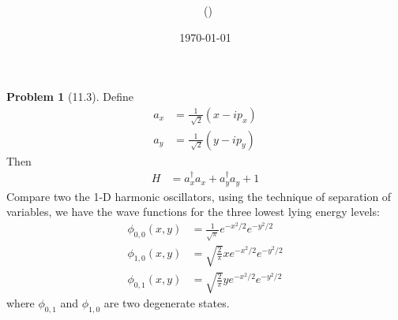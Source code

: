 \documentclass[twoside,11pt]{article}
\title{{\lms \Code \ \Ass}}
\author{\lms \name \ (\href{mailto:\mail}{\mail})}
\date{\sffamily \today}
\makeatletter
\theoremstyle{definition}
\newtheorem{problem}{Problem}
\theoremstyle{remark}
\newtheorem*{remark}{Remark}
\renewcommand{\maketitle}{\bgroup\setlength{\parindent}{0pt}
\begin{flushleft}
  \textbf{\Large\@title}

  \@author
\end{flushleft}\egroup
}
\makeatother
\begin{document}
\maketitle
\thispagestyle{title}



\begin{problem}[11.3]
Define
\begin{align*}
    a_x &= \frac{1}{\sqrt[]{2}}(x - ip_x)\\
    a_y &= \frac{1}{\sqrt[]{2}}(y - ip_y)
\end{align*}
Then 
\begin{align*}
    H &= a_x^\dagger a_x + a_y^\dagger a_y + 1
\end{align*}
Compare two the 1-D harmonic oscillators, using the technique of separation of variables,
we have the wave functions for the three lowest lying energy levels:
\begin{align*}
    \phi_{0,0}(x, y) &= \frac{1}{\sqrt{\pi}}e^{-x^2/2} e^{-y^2/2}\\
    \phi_{1,0}(x, y) &= \sqrt{\frac{2}{\pi}}xe^{-x^2/2} e^{-y^2/2}\\
    \phi_{0,1}(x, y) &= \sqrt{\frac{2}{\pi}}ye^{-x^2/2} e^{-y^2/2}
\end{align*}
where $\phi_{0,1}$ and $\phi_{1,0}$ are two degenerate states.


\end{problem}
\end{document}
